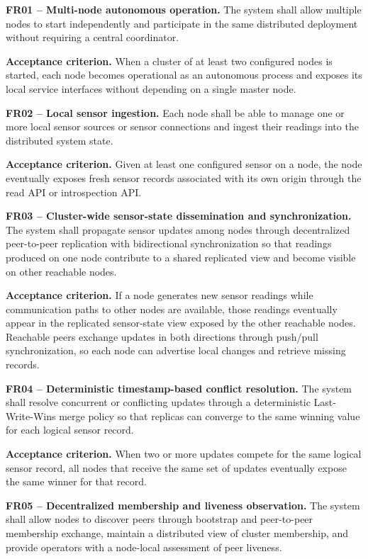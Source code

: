 \textbf{FR01 -- Multi-node autonomous operation.}
The system shall allow multiple nodes to start independently and participate in the same distributed deployment without requiring a central coordinator.

\textbf{Acceptance criterion.}
When a cluster of at least two configured nodes is started, each node becomes operational as an autonomous process and exposes its local service interfaces without depending on a single master node.

\medskip
\textbf{FR02 -- Local sensor ingestion.}
Each node shall be able to manage one or more local sensor sources or sensor connections and ingest their readings into the distributed system state.

\textbf{Acceptance criterion.}
Given at least one configured sensor on a node, the node eventually exposes fresh sensor records associated with its own origin through the read API or introspection API.

\medskip
\textbf{FR03 -- Cluster-wide sensor-state dissemination and synchronization.}
The system shall propagate sensor updates among nodes through decentralized peer-to-peer replication with bidirectional synchronization so that readings produced on one node contribute to a shared replicated view and become visible on other reachable nodes.

\textbf{Acceptance criterion.}
If a node generates new sensor readings while communication paths to other nodes are available, those readings eventually appear in the replicated sensor-state view exposed by the other reachable nodes. Reachable peers exchange updates in both directions through push/pull synchronization, so each node can advertise local changes and retrieve missing records.

\medskip
\textbf{FR04 -- Deterministic timestamp-based conflict resolution.}
The system shall resolve concurrent or conflicting updates through a deterministic Last-Write-Wins merge policy so that replicas can converge to the same winning value for each logical sensor record.

\textbf{Acceptance criterion.}
When two or more updates compete for the same logical sensor record, all nodes that receive the same set of updates eventually expose the same winner for that record.

\medskip
\textbf{FR05 -- Decentralized membership and liveness observation.}
The system shall allow nodes to discover peers through bootstrap and peer-to-peer membership exchange, maintain a distributed view of cluster membership, and provide operators with a node-local assessment of peer liveness.

